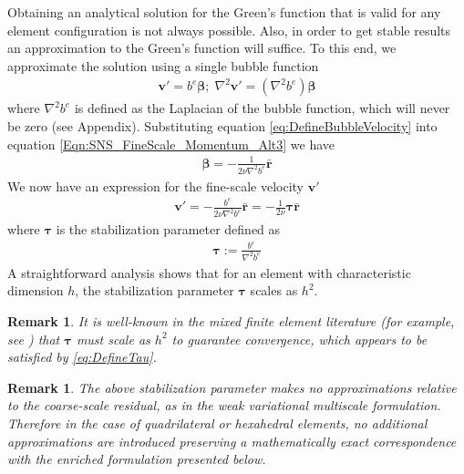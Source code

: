 \documentclass[11pt]{amsart}
\newtheorem{remark}[theorem]{Remark}
\begin{document}
Obtaining an analytical solution for the Green's function that is valid for any element configuration is not always possible.  Also, in order to get stable results an approximation to the Green's function will suffice.  To this end, we approximate the solution using a single bubble function
\begin{align}
 \label{eq:DefineBubbleVelocity}
\boldsymbol{v}' = b^e \boldsymbol{\beta}; \; \nabla^2 \boldsymbol{v}' = (\nabla^2 b^e) \boldsymbol{\beta}
\end{align}
where $\nabla^2 b^e$ is defined as the Laplacian of the bubble function, which will never be zero (see Appendix).  Substituting equation \eqref{eq:DefineBubbleVelocity} into equation \eqref{Eqn:SNS_FineScale_Momentum_Alt3} we have
\begin{align}
 \label{eq:AlmostTau}
 \boldsymbol{\beta} = - \frac{1}{2\nu \nabla^2 b^e} \bar{\boldsymbol{r}}
\end{align}
We now have an expression for the fine-scale velocity $\boldsymbol{v}'$
\begin{align}
 \label{eq:DefineAlternateFineVel}
 \boldsymbol{v}' = - \frac{b^e}{2\nu \nabla^2 b^e} \bar{\boldsymbol{r}} = - \frac{1}{2\nu} \boldsymbol{\tau}\bar{\boldsymbol{r}}
\end{align}
where $\boldsymbol{\tau}$ is the stabilization parameter defined as
\begin{align}
 \label{eq:DefineTau}
 \boldsymbol{\tau} := \frac{b^e}{\nabla^2 b^e} 
\end{align}
A straightforward analysis shows that for an element with characteristic dimension $h$, the stabilization parameter $\boldsymbol{\tau}$ scales as $h^2$.
\begin{remark}
It is well-known in the mixed finite element literature (for example, see \cite{Douglas,PSPG}) that $\boldsymbol{\tau}$ must scale as $h^2$ to guarantee convergence, which appears to be satisfied by \eqref{eq:DefineTau}.
\end{remark}
\begin{remark}
The above stabilization parameter makes no approximations relative to the coarse-scale residual, as in the weak variational multiscale formulation.  Therefore in the case of quadrilateral or hexahedral elements, no additional approximations are introduced preserving a mathematically exact correspondence with the enriched formulation presented below.
\end{remark}
\end{document}
